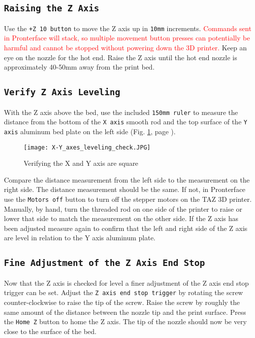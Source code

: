 \subsection{\texttt{Raising the Z Axis}}
Use the \texttt{+Z 10 button} to move the Z axis up in \texttt{10mm} increments. \textcolor{red}{Commands sent in Pronterface will stack, so multiple movement button presses can potentially be harmful and cannot be stopped without powering down the 3D printer.} Keep an eye on the nozzle for the hot end. Raise the Z axis until the hot end nozzle is approximately 40-50mm away from the print bed.

\subsection{\texttt{Verify Z Axis Leveling}}
With the Z axis above the bed, use the included \texttt{150mm ruler} to measure the distance from the bottom of the \texttt{X axis} smooth rod and the top surface of the \texttt{Y axis} aluminum bed plate on the left side (Fig. \ref{fig:X-Y_axes_leveling_check}, page \pageref{fig:X-Y_axes_leveling_check}).
\begin{figure}[H]
\centering
\texttt{[image: X-Y\_axes\_leveling\_check.JPG]}
\caption{Verifying the X and Y axis are square}
\label{fig:X-Y_axes_leveling_check}
\end{figure}
Compare the distance measurement from the left side to the measurement on the right side. The distance measurement should be the same. If not, in Pronterface use the \texttt{Motors off} button to turn off the stepper motors on the TAZ 3D printer. Manually, by hand, turn the threaded rod on one side of the printer to raise or lower that side to match the measurement on the other side. If the Z axis has been adjusted measure again to confirm that the left and right side of the Z axis are level in relation to the Y axis aluminum plate.


\subsection{\texttt{Fine Adjustment of the Z Axis End Stop}}
\begin{comment}
\begin{figure}[H]
\centering
\texttt{[image: Z\_end\_stop\_trigger.JPG]}
\caption{Z end stop trigger}
\label{fig:Z_end_stop_trigger}
\end{figure}
\end{comment}
Now that the Z axis is checked for level a finer adjustment of the Z axis end stop trigger can be set.
Adjust the \texttt{Z axis end stop trigger} by rotating the screw counter-clockwise to raise the tip of the screw. Raise the screw by roughly the same amount of the distance between the nozzle tip and the print surface. Press the \texttt{Home Z} button to home the Z axis. The tip of the nozzle should now be very close to the surface of the bed.

